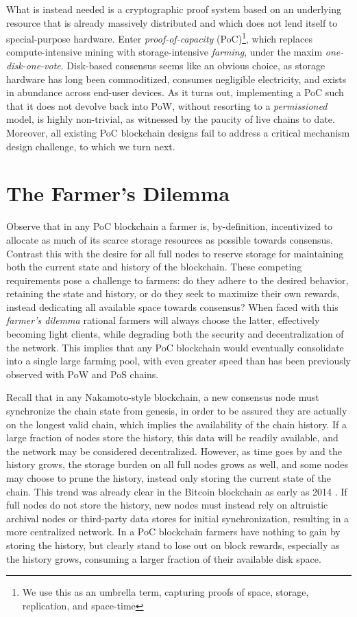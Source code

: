 \documentclass[conference]{IEEEtran}
\begin{document}
What is instead needed is a cryptographic proof system based on an underlying resource that is already massively distributed and which does not lend itself to special-purpose hardware. Enter \textit{proof-of-capacity} (PoC)\footnote{We use this as an umbrella term, capturing proofs of space, storage, replication, and space-time}, which replaces compute-intensive mining with storage-intensive \textit{farming}, under the maxim \textit{one-disk-one-vote}. Disk-based consensus seems like an obvious choice, as storage hardware has long been commoditized, consumes negligible electricity, and exists in abundance across end-user devices. As it turns out, implementing a PoC such that it does not devolve back into PoW, without resorting to a \textit{permissioned} model, is highly non-trivial, as witnessed by the paucity of live chains to date. Moreover, all existing PoC blockchain designs fail to address a critical mechanism design challenge, to which we turn next. 

\section{The Farmer's Dilemma}

Observe that in any PoC blockchain a farmer is, by-definition, incentivized to allocate as much of its scarce storage resources as possible towards consensus. Contrast this with the desire for all full nodes to reserve storage for maintaining both the current state and history of the blockchain. These competing requirements pose a challenge to farmers: do they adhere to the desired behavior, retaining the state and history, or do they seek to maximize their own rewards, instead dedicating all available space towards consensus? When faced with this \textit{farmer’s dilemma} rational farmers will always choose the latter, effectively becoming light clients, while degrading both the security and decentralization of the network. This implies that any PoC blockchain would eventually consolidate into a single large farming pool, with even greater speed than has been previously observed with PoW and PoS chains.

Recall that in any Nakamoto-style blockchain, a new consensus node must synchronize the chain state from genesis, in order to be assured they are actually on the longest valid chain, which implies the availability of the chain history. If a large fraction of nodes store the history, this data will be readily available, and the network may be considered decentralized. However, as time goes by and the history grows, the storage burden on all full nodes grows as well, and some nodes may choose to prune the history, instead only storing the current state of the chain. This trend was already clear in the Bitcoin blockchain as early as 2014 \cite{lerner_2015}. If full nodes do not store the history, new nodes must instead rely on altruistic archival nodes or third-party data stores for initial synchronization, resulting in a more centralized network. In a PoC blockchain farmers have nothing to gain by storing the history, but clearly stand to lose out on block rewards, especially as the history grows, consuming a larger fraction of their available disk space.
\end{document}
